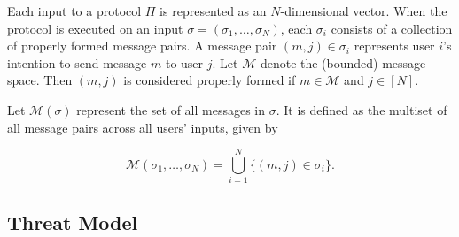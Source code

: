 Each input to a protocol $\Pi$ is represented as an $N$-dimensional vector. When the protocol is executed on an input $\sigma = (\sigma_1, \dots, \sigma_N)$, each $\sigma_i$ consists of a collection of properly formed message pairs. A message pair $(m,j) \in \sigma_i$ represents user $i$'s intention to send message $m$ to user $j$. Let $\mathcal{M}$ denote the (bounded) message space. Then $(m,j)$ is considered properly formed if $m \in \mathcal{M}$ and $j \in [N]$. 

Let $\mathcal{M}(\sigma)$ represent the set of all messages in $\sigma$. It is defined as the multiset of all message pairs across all users' inputs, given by

$$
\mathcal{M}(\sigma_1, \dots, \sigma_N) = \bigcup_{i=1}^{N} \{ (m,j) \in \sigma_i \}.
$$

\subsection{Threat Model}


